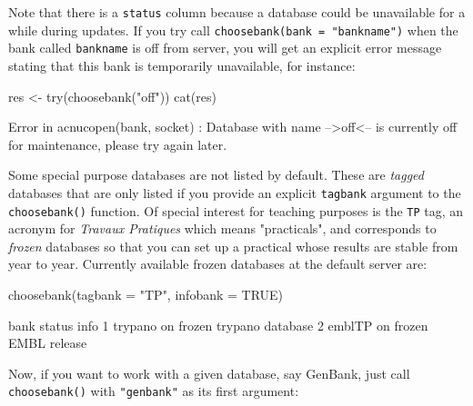 \documentclass{article}
\begin{document}
Note that there is a \texttt{status} column because a database could be unavailable
for a while during updates. If you try call \texttt{choosebank(bank = "bankname")} 
when the bank called \texttt{bankname} is off from server, you will get an explicit 
error message stating that this bank is temporarily unavailable, for instance:

\begin{Schunk}
\begin{Sinput}
 res <- try(choosebank("off"))
 cat(res)
\end{Sinput}
\begin{Soutput}
Error in acnucopen(bank, socket) : 
  Database with name -->off<-- is currently off for maintenance, please try again later.
\end{Soutput}
\end{Schunk}

Some special purpose databases are not listed by default. These are \textit{tagged} databases
that are only listed if you provide an explicit \texttt{tagbank} argument to the \texttt{choosebank()}
function. Of special interest for teaching purposes is the \texttt{TP} tag, an acronym for
\textit{Travaux Pratiques} which means "practicals", and corresponds to \emph{frozen}
databases so that you can set up a practical whose results are stable from year to year. Currently
available frozen databases at the default server are:

\begin{Schunk}
\begin{Sinput}
 choosebank(tagbank = "TP", infobank = TRUE)
\end{Sinput}
\begin{Soutput}
     bank status                    info
1 trypano     on frozen trypano database
2  emblTP     on     frozen EMBL release
\end{Soutput}
\end{Schunk}


Now, if you want to work with a given database, say GenBank, just call \texttt{choosebank()}
with \texttt{"genbank"} as its first argument:
\end{document}
